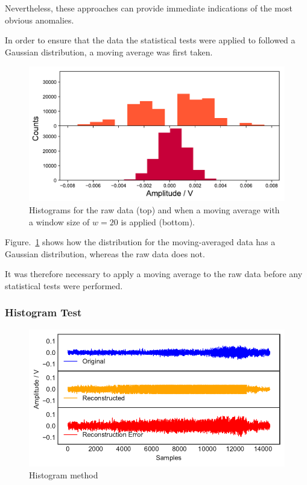 Nevertheless, these approaches can provide immediate indications of the most obvious anomalies. 

In order to ensure that the data the statistical tests were applied to followed a Gaussian distribution, a moving average was first taken.

\begin{figure}[t]
    \includegraphics[width=1.0\textwidth]{fig/moving_av_hist.pdf}
    \caption[Moving Average Histogram]{Histograms for the raw data (top) and when a moving average with a window size of $w=20$ is applied (bottom).}
    \label{fig:move_av_hist}
\end{figure}

Figure.~\ref{fig:move_av_hist} shows how the distribution for the moving-averaged data has a Gaussian distribution, whereas the raw data does not.

It was therefore necessary to apply a moving average to the raw data before any statistical tests were performed.

\subsubsection{Histogram Test}

\begin{figure}[t]
    \includegraphics[width=1.0\textwidth]{fig/histogram.pdf}
    \caption[Histogram]{Histogram method}
    \label{fig:histogram}
\end{figure}

